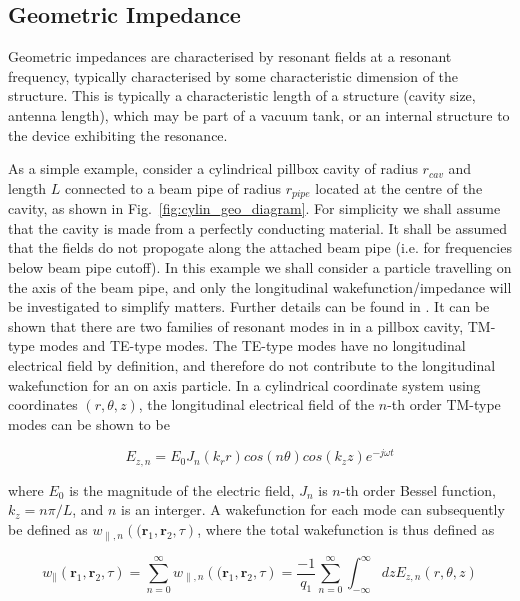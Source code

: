 \subsection{Geometric Impedance}
\label{sec:imp_geo_imp}

Geometric impedances are characterised by resonant fields at a resonant frequency, typically characterised by some characteristic dimension of the structure. This is typically a characteristic length of a structure (cavity size, antenna length), which may be part of a vacuum tank, or an internal structure to the device exhibiting the resonance. 

As a simple example, consider a cylindrical pillbox cavity of radius $r_{cav}$ and length $L$ connected to a beam pipe of radius $r_{pipe}$ located at the centre of the cavity, as shown in Fig.~\ref{fig:cylin_geo_diagram}. For simplicity we shall assume that the cavity is made from a perfectly conducting material. It shall be assumed that the fields do not propogate along the attached beam pipe (i.e. for frequencies below beam pipe cutoff). In this example we shall consider a particle travelling on the axis of the beam pipe, and only the longitudinal wakefunction/impedance will be investigated to simplify matters. Further details can be found in \cite{Wolsky:TheoryEM, Jensen:RFCav, Stupakov:wakeAndImp}. It can be shown that there are two families of resonant modes in in a pillbox cavity, TM-type modes and TE-type modes. The TE-type modes have no longitudinal electrical field by definition, and therefore do not contribute to the longitudinal wakefunction for an on axis particle. In a cylindrical coordinate system using coordinates $(r, \theta, z)$, the longitudinal electrical field of the $n$-th order TM-type modes can be shown to be

\begin{equation}
E_{z,n} = E_{0}J_{n}\left( k_{r} r \right) cos \left( n \theta \right) cos \left( k_{z} z \right) e^{-j \omega t}
\end{equation}

where $E_{0}$ is the magnitude of the electric field, $J_{n}$ is $n$-th order Bessel function, $k_{z}=n\pi{}/L$, and $n$ is an interger. A wakefunction for each mode can subsequently be defined as $w_{\parallel ,n}\left(( \mathbf{r}_{1}, \mathbf{r}_{2}, \tau \right)$, where the total wakefunction is thus defined as

\begin{equation}
w_{\parallel} \left( \mathbf{r}_{1}, \mathbf{r}_{2}, \tau \right) =  \displaystyle\sum\limits_{n = 0}^{\infty} w_{\parallel ,n} \left(( \mathbf{r}_{1}, \mathbf{r}_{2}, \tau \right) = \frac{-1}{q_{1}}\displaystyle\sum\limits_{n = 0}^{\infty} \int^{\infty}_{-\infty} dz E_{z,n} \left( r, \theta , z \right)
\end{equation}

